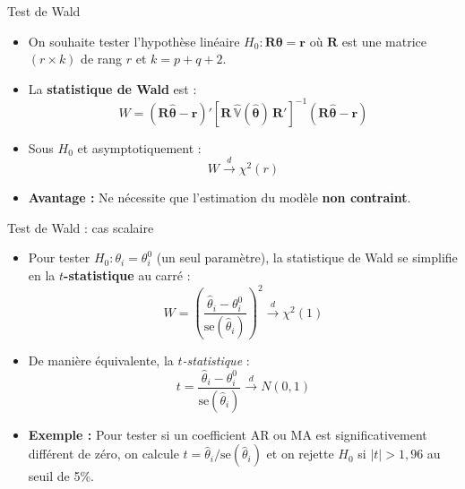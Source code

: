 \documentclass[11pt,aspectratio=169]{beamer}
\newcommand{\Var}{\mathbb{V}}
\begin{document}
\begin{frame}{Test de Wald}

\begin{itemize}

\item On souhaite tester l'hypothèse linéaire $H_0 : \mathbf{R}\bm{\theta} = \mathbf{r}$ où $\mathbf{R}$ est une matrice $(r \times k)$ de rang $r$ et $k = p + q + 2$.\newline

\item La \textbf{statistique de Wald} est :
  \[
  W = (\mathbf{R}\hat{\bm{\theta}} - \mathbf{r})'\left[\mathbf{R}\,\widehat{\Var}(\hat{\bm{\theta}})\,\mathbf{R}'\right]^{-1}(\mathbf{R}\hat{\bm{\theta}} - \mathbf{r})
  \]\newline

\item Sous $H_0$ et asymptotiquement :
  \[
  W \xrightarrow{d} \chi^2(r)
  \]\newline

\item \textbf{Avantage :} Ne nécessite que l'estimation du modèle \textbf{non contraint}.

\end{itemize}

\end{frame}

\begin{frame}{Test de Wald : cas scalaire}

\begin{itemize}

\item Pour tester $H_0 : \theta_i = \theta_i^0$ (un seul paramètre), la statistique de Wald se simplifie en la \textbf{$t$-statistique} au carré :
  \[
  W = \left(\frac{\hat{\theta}_i - \theta_i^0}{\text{se}(\hat{\theta}_i)}\right)^2 \xrightarrow{d} \chi^2(1)
  \]\newline

\item De manière équivalente, la \emph{$t$-statistique} :
  \[
  t = \frac{\hat{\theta}_i - \theta_i^0}{\text{se}(\hat{\theta}_i)} \xrightarrow{d} N(0,1)
  \]\newline

\item \textbf{Exemple :} Pour tester si un coefficient AR ou MA est significativement différent de zéro, on calcule $t = \hat{\theta}_i / \text{se}(\hat{\theta}_i)$ et on rejette $H_0$ si $|t| > 1{,}96$ au seuil de 5\%.

\end{itemize}

\end{frame}
\end{document}
